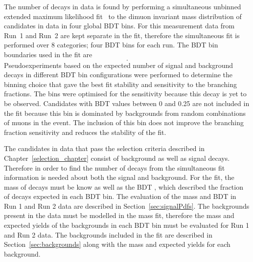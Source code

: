 The number of \bmumu decays in data is found by performing a simultaneous unbinned extended maximum likelihood fit~\cite{Brun:1997pa,James:1975dr} to the dimuon invariant mass distribution of \bmumu candidates in data in four global BDT bins. For this measurement data from Run~1 and Run~2 are kept separate in the fit, therefore the simultaneous fit is performed over 8 categories; four BDT bins for each run.
The BDT bin boundaries used in the fit are
\begin{equation}
[0.25, 0.4, 0.5, 0.6, 1.0].
\label{eq:BDTbins}
\end{equation}
Pseudoexperiments based on the expected number of signal and background decays in different BDT bin configurations were performed to determine the binning choice that gave the best fit stability and sensitivity to the \bmumu branching fractions. The bins were optimised for the \bdmumu sensitivity because this decay is yet to be observed.
Candidates with BDT values between 0 and 0.25 are not included in the fit because this bin is dominated by backgrounds from random combinations of muons in the event. The inclusion of this bin does not improve the branching fraction sensitivity and reduces the stability of the fit. %

The candidates in data that pass the selection criteria described in Chapter~\ref{selection_chapter} consist of background as well as signal decays. Therefore in order to find the number of \bmumu decays from the simultaneous fit information is needed about both the signal and background. For the fit, the mass \pdf of \bmumu decays must be know as well as the BDT \pdf, which described the fraction of \bmumu decays expected in each BDT bin. The evaluation of the \bmumu mass and BDT \pdfs in Run 1 and Run 2 data are described in Section~\ref{sec:signalPdfs}. The backgrounds present in the data must be modelled in the mass fit, therefore the mass \pdfs and expected yields of the backgrounds in each BDT bin must be evaluated for Run 1 and Run 2 data. The backgrounds included in the fit are described in Section~\ref{sec:backgrounds} along with the mass \pdfs and expected yields for each background. 




